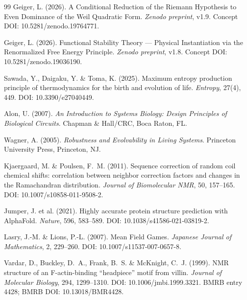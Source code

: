 \documentclass[12pt,a4paper]{article}
\theoremstyle{remark}
\begin{document}
\begin{thebibliography}{99}
Geiger, L. (2026).
\newblock A Conditional Reduction of the Riemann Hypothesis to Even Dominance of the Weil Quadratic Form.
\newblock \textit{Zenodo preprint}, v1.9.
\newblock Concept DOI: 10.5281/zenodo.19764771.

Geiger, L. (2026).
\newblock Functional Stability Theory --- Physical Instantiation via the Renormalized Free Energy Principle.
\newblock \textit{Zenodo preprint}, v1.8.
\newblock Concept DOI: 10.5281/zenodo.19036190.

Sawada, Y., Daigaku, Y. \& Toma, K. (2025).
\newblock Maximum entropy production principle of thermodynamics for the birth and evolution of life.
\newblock \textit{Entropy}, 27(4), 449.
\newblock DOI: 10.3390/e27040449.

Alon, U. (2007).
\newblock \textit{An Introduction to Systems Biology: Design Principles of Biological Circuits}.
\newblock Chapman \& Hall/CRC, Boca Raton, FL.

Wagner, A. (2005).
\newblock \textit{Robustness and Evolvability in Living Systems}.
\newblock Princeton University Press, Princeton, NJ.

Kjaergaard, M. \& Poulsen, F.~M. (2011).
\newblock Sequence correction of random coil chemical shifts: correlation between neighbor correction factors and changes in the Ramachandran distribution.
\newblock \textit{Journal of Biomolecular NMR}, 50, 157--165.
\newblock DOI: 10.1007/s10858-011-9508-2.

Jumper, J. et al. (2021).
\newblock Highly accurate protein structure prediction with AlphaFold.
\newblock \textit{Nature}, 596, 583--589.
\newblock DOI: 10.1038/s41586-021-03819-2.

Lasry, J.-M. \& Lions, P.-L. (2007).
\newblock Mean Field Games.
\newblock \textit{Japanese Journal of Mathematics}, 2, 229--260.
\newblock DOI: 10.1007/s11537-007-0657-8.

Vardar, D., Buckley, D.~A., Frank, B.~S. \& McKnight, C.~J. (1999).
\newblock NMR structure of an F-actin-binding ``headpiece'' motif from villin.
\newblock \textit{Journal of Molecular Biology}, 294, 1299--1310.
\newblock DOI: 10.1006/jmbi.1999.3321.
\newblock BMRB entry 4428; BMRB DOI: 10.13018/BMR4428.


\end{thebibliography}
\end{document}
